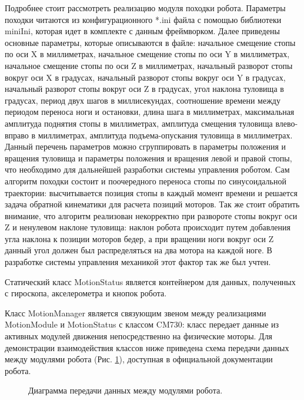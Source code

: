 Подробнее стоит рассмотреть реализацию модуля походки робота. Параметры походки читаются из конфигурационного *.ini файла с помощью библиотеки miniIni, которая идет в комплекте с данным фреймворком. Далее приведены основные параметры, которые описываются в файле: начальное смещение стопы по оси X в миллиметрах, начальное смещение стопы по оси Y в миллиметрах, начальное смещение стопы по оси Z в миллиметрах, начальный разворот стопы вокруг оси X в градусах, начальный разворот стопы вокруг оси Y в градусах, начальный разворот стопы вокруг оси Z в градусах, угол наклона туловища в градусах, период двух шагов в миллисекундах, соотношение времени между периодом переноса ноги и остановки, длина шага в миллиметрах, максимальная амплитуда поднятия стопы в миллиметрах, амплитуда смещения туловища влево-вправо в миллиметрах, амплитуда подъема-опускания туловища в миллиметрах. Данный перечень параметров можно сгруппировать в параметры положения и вращения туловища и параметры положения и вращения левой и правой стопы, что необходимо для дальнейшей разработки системы управления роботом. Сам алгоритм походки состоит и поочередного переноса стопы по синусоидальной траектории: высчитывается позиция стопы в каждый момент времени и решается задача обратной кинематики для расчета позиций моторов. Так же стоит обратить внимание, что алгоритм реализован некорректно при развороте стопы вокруг оси Z и ненулевом наклоне туловища: наклон робота происходит путем добавления угла наклона к позиции моторов бедер, а при вращении ноги вокруг оси Z данный угол должен был распределяться на два мотора на каждой ноге. В разработке системы управления механикой этот фактор так же был учтен.

Статический класс MotionStatus является контейнером для данных, полученных с гироскопа, акселерометра и кнопок робота.

Класс MotionManager является связующим звеном между реализациями MotionModule и MotionStatus с классом CM730: класс передает данные из активных модулей движения непосредственно на физические моторы.
Для демонстрации взаимодействия классов ниже приведена схема передачи данных между модулями робота (Рис. \ref{im:1_framework_pipeline}), доступная в официальной документации робота\cite{urldarwinopemanual}.

\begin{figure}[h]
\caption{Диаграмма передачи данных между модулями робота.}
\label{im:1_framework_pipeline}
\end{figure}

